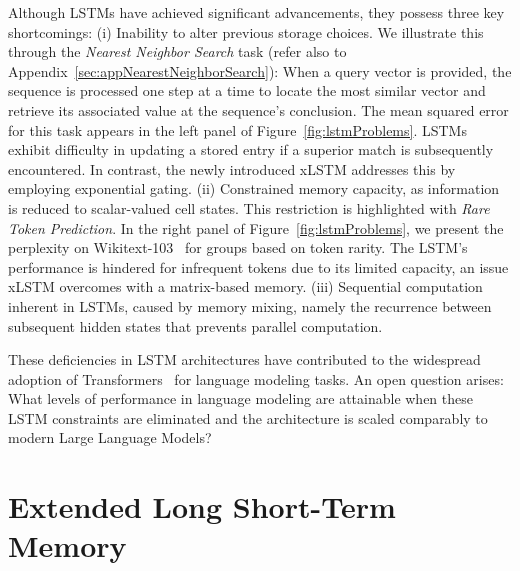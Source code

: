Although LSTMs have achieved significant advancements, they possess three key shortcomings: (i) Inability to alter previous storage choices. We illustrate this through the {\it Nearest Neighbor Search} task (refer also to Appendix~\ref{sec:appNearestNeighborSearch}): When a query vector is provided, the sequence is processed one step at a time to locate the most similar vector and retrieve its associated value at the sequence's conclusion. The mean squared error for this task appears in the left panel of Figure~\ref{fig:lstmProblems}. LSTMs exhibit difficulty in updating a stored entry if a superior match is subsequently encountered. In contrast, the newly introduced xLSTM addresses this by employing exponential gating. (ii) Constrained memory capacity, as information is reduced to scalar-valued cell states. This restriction is highlighted with {\it Rare Token Prediction}. In the right panel of Figure~\ref{fig:lstmProblems}, we present the perplexity on Wikitext-103~\citep{Merity:17} for groups based on token rarity. The LSTM's performance is hindered for infrequent tokens due to its limited capacity, an issue xLSTM overcomes with a matrix-based memory. (iii) Sequential computation inherent in LSTMs, caused by memory mixing, namely the recurrence between subsequent hidden states that prevents parallel computation.

These deficiencies in LSTM architectures have contributed to the widespread adoption of Transformers~\citep{Vaswani:17} for language modeling tasks. An open question arises: What levels of performance in language modeling are attainable when these LSTM constraints are eliminated and the architecture is scaled comparably to modern Large Language Models?

\section{Extended Long Short-Term Memory}
\label{sec:xLSTM}

